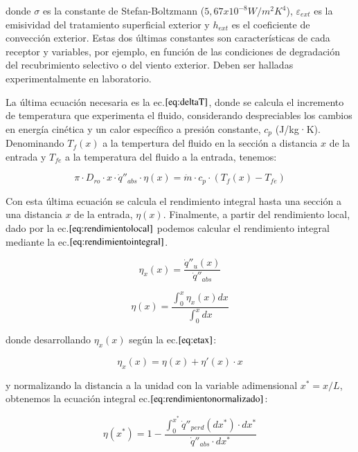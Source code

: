 donde \(\sigma\) es la constante de Stefan-Boltzmann ($5,67x10^{-8} W/m^2K^4$), \(\varepsilon_{ext}\) es la emisividad del tratamiento superficial exterior y \(h_{ext}\) es el coeficiente de convección exterior. Estas dos últimas constantes son características de cada receptor y variables, por ejemplo, en función de las condiciones de degradación del recubrimiento selectivo o del viento exterior. Deben ser halladas experimentalmente en laboratorio.

La última ecuación necesaria es la ec.\(\eqref{eq:deltaT}\), donde se calcula el incremento de temperatura que experimenta el fluido, considerando despreciables los cambios en energía cinética y un calor específico a presión constante, \(c_{p}\) (J/kg·K). Denominando \(T_{f}(x)\) a la tempertura del fluido en la sección a distancia \(x\) de la entrada y \(T_{fe}\) a la temperatura del fluido a la entrada, tenemos:

\begin{equation}
    \pi \cdot D_{ro} \cdot x \cdot \dot q''_{abs} \cdot \eta(x)= \dot{m} \cdot c_{p} \cdot (T_{f}(x)-T_{fe}) \label{eq:deltaT}
\end{equation}

Con esta última ecuación se calcula el rendimiento integral hasta una sección a una distancia \(x\) de la entrada, \(\eta(x)\). Finalmente, a partir del rendimiento local, dado por la ec.\(\eqref{eq:rendimientolocal}\) podemos calcular el rendimiento integral mediante la ec.\(\eqref{eq:rendimientointegral}\).

\begin{equation}
    \eta_{x}(x) = \frac{\dot q''_{u}(x)}{\dot q''_{abs}} \label{eq:rendimientolocal}
\end{equation}

\begin{equation}
    \eta(x) = \frac{\int_{0}^{x}\eta_{x}(x)dx}{\int_{0}^{x}dx} \label{eq:rendimientointegral}
\end{equation}

donde desarrollando \(\eta_{x}(x)\) según la ec.\(\eqref{eq:etax}\):

\begin{equation}
    \eta_{x}(x) = \eta(x) + \eta'(x)\cdot x  \label{eq:etax}
\end{equation}

y normalizando la distancia a la unidad con la variable adimensional \(x^{*}=x/L\), obtenemos la ecuación integral ec.\(\eqref{eq:rendimientonormalizado}\):

\begin{equation}
    \eta(x^{*}) = 1 - \frac{\int_{0}^{x^{*}} \dot q''_{perd}(dx^{*})\cdot dx^{*}}{\dot q''_{abs}\cdot dx^{*}} \label{eq:rendimientonormalizado}
\end{equation}

